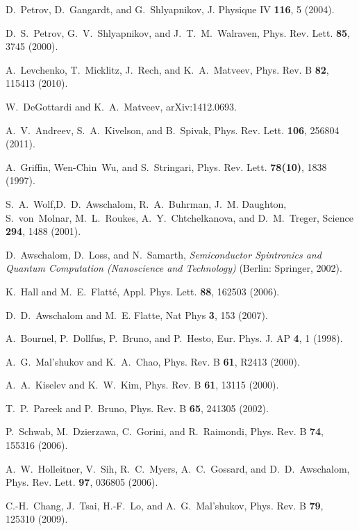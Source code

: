 \begin{thebibliography}{99}
D.~Petrov, D.~Gangardt, and G.~Shlyapnikov, J. Physique IV \textbf{116}, 5 (2004). 

D.~S.~Petrov, G.~V.~Shlyapnikov, and J.~T.~M.~Walraven, 
Phys. Rev. Lett. \textbf{85}, 3745 (2000).

A.~Levchenko, T.~Micklitz, J.~Rech, and K.~A.~Matveev, Phys. Rev. B \textbf{82}, 115413 (2010).

W.~DeGottardi and K.~A.~Matveev, arXiv:1412.0693.

A.~V.~Andreev, S.~A.~Kivelson, and B.~Spivak, Phys. Rev. Lett. \textbf{106}, 256804 (2011).

A.~Griffin, Wen-Chin~Wu, and S.~Stringari, Phys. Rev. Lett. \textbf{78(10)}, 1838 (1997).

S.~A.~Wolf,D.~D.~Awschalom, R.~A.~Buhrman, J.~M. Daughton, S.~von~Molnar, M.~L.~Roukes, A.~Y.~Chtchelkanova, and D.~M.~Treger, Science \textbf{294}, 1488 (2001).

D.~Awschalom, D.~Loss, and N.~Samarth, \emph{Semiconductor Spintronics and Quantum Computation
  (Nanoscience and Technology)} (Berlin: Springer, 2002).

K.~Hall and M.~E.~Flatt\'e, Appl. Phys. Lett. \textbf{88}, 162503 (2006).
	
 D.~D.~Awschalom and M.~E. Flatte, Nat Phys \textbf{3}, 153 (2007).

 A.~Bournel, P.~Dollfus, P.~Bruno, and P.~Hesto, Eur. Phys. J. AP \textbf{4}, 1 (1998).

 A.~G.~Mal'shukov and K.~A.~Chao, Phys. Rev. B \textbf{61}, R2413 (2000).

 A.~A.~Kiselev and K.~W.~Kim, Phys. Rev. B \textbf{61}, 13115 (2000).

 T.~P.~Pareek and P.~Bruno, Phys. Rev. B \textbf{65}, 241305 (2002).

 P.~Schwab, M.~Dzierzawa, C.~Gorini, and R.~Raimondi, Phys. Rev. B \textbf{74}, 155316 (2006).

 A.~W.~Holleitner, V.~Sih, R.~C.~Myers, A.~C.~Gossard, and D.~D.~Awschalom, Phys. Rev. Lett. \textbf{97}, 036805 (2006).

 C.-H.~Chang, J.~Tsai, H.-F.~Lo, and A.~G.~Mal'shukov, Phys. Rev. B \textbf{79}, 125310 (2009).


\end{thebibliography}
